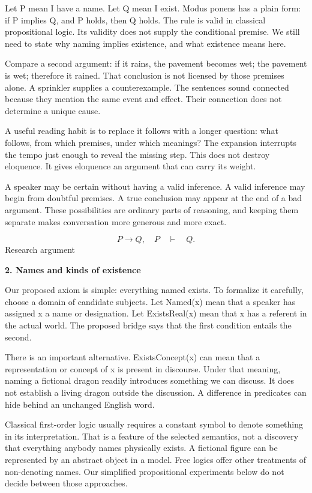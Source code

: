 \documentclass[10pt]{article}
\begin{document}
Let P mean I have a name. Let Q mean I exist. Modus ponens has a plain form: if P implies Q, and P holds, then Q holds. The rule is valid in classical propositional logic. Its validity does not supply the conditional premise. We still need to state why naming implies existence, and what existence means here.\par
Compare a second argument: if it rains, the pavement becomes wet; the pavement is wet; therefore it rained. That conclusion is not licensed by those premises alone. A sprinkler supplies a counterexample. The sentences sound connected because they mention the same event and effect. Their connection does not determine a unique cause.\par
A useful reading habit is to replace it follows with a longer question: what follows, from which premises, under which meanings? The expansion interrupts the tempo just enough to reveal the missing step. This does not destroy eloquence. It gives eloquence an argument that can carry its weight.\par
A speaker may be certain without having a valid inference. A valid inference may begin from doubtful premises. A true conclusion may appear at the end of a bad argument. These possibilities are ordinary parts of reasoning, and keeping them separate makes conversation more generous and more exact.\par
\[P\to Q,\quad P\quad\vdash\quad Q.\]
\clearpage
{\small\color{accent}Research argument}\par
{\LARGE\bfseries\color{ink}2. Names and kinds of existence}\par\vspace{7pt}
Our proposed axiom is simple: everything named exists. To formalize it carefully, choose a domain of candidate subjects. Let Named(x) mean that a speaker has assigned x a name or designation. Let ExistsReal(x) mean that x has a referent in the actual world. The proposed bridge says that the first condition entails the second.\par
There is an important alternative. ExistsConcept(x) can mean that a representation or concept of x is present in discourse. Under that meaning, naming a fictional dragon readily introduces something we can discuss. It does not establish a living dragon outside the discussion. A difference in predicates can hide behind an unchanged English word.\par
Classical first-order logic usually requires a constant symbol to denote something in its interpretation. That is a feature of the selected semantics, not a discovery that everything anybody names physically exists. A fictional figure can be represented by an abstract object in a model. Free logics offer other treatments of non-denoting names. Our simplified propositional experiments below do not decide between those approaches.\par
\end{document}
